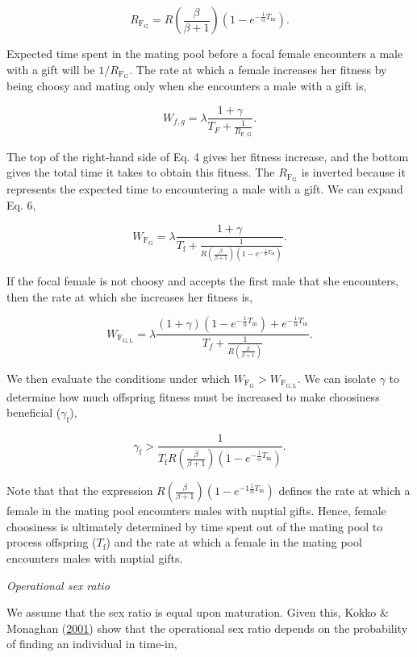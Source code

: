 \documentclass[
]{article}
\begin{document}
\[R_{\mathrm{F_{G}}} = R \left(\frac{\beta}{\beta + 1}\right)\left(1 - e^{-\frac{1}{\alpha}T_{\mathrm{m}}}\right).\]

Expected time spent in the mating pool before a focal female encounters
a male with a gift will be \(1/R_{\mathrm{F_{G}}}\). The rate at which a
female increases her fitness by being choosy and mating only when she
encounters a male with a gift is,

\[W_{f, g} = \lambda \frac{1 + \gamma}{T_{F} + \frac{1}{R_{\mathrm{F,G}}}}.
\tag{4}
\]

The top of the right-hand side of Eq. 4 gives her fitness increase, and
the bottom gives the total time it takes to obtain this fitness. The
\(R_{\mathrm{F_{G}}}\) is inverted because it represents the expected
time to encountering a male with a gift. We can expand Eq. 6,

\[W_{\mathrm{F_{G}}} = \lambda \frac{1 + \gamma}{T_{\mathrm{f}} + \frac{1}{R \left(\frac{\beta}{\beta + 1}\right)\left(1 - e^{-\frac{1}{\alpha}T_{\mathrm{m}}}\right)}}.\]

If the focal female is not choosy and accepts the first male that she
encounters, then the rate at which she increases her fitness is,

\[W_{\mathrm{F_{G,L}}} = \lambda \frac{\left(1 + \gamma\right)\left(1 - e^{-\frac{1}{\alpha}T_{\mathrm{m}}}\right) + e^{-\frac{1}{\alpha}T_{\mathrm{m}}}}{T_{f} + \frac{1}{R \left(\frac{\beta}{\beta + 1}\right)}}.\]

We then evaluate the conditions under which
\(W_{\mathrm{F_{G}}} > W_{\mathrm{F_{G,L}}}\). We can isolate \(\gamma\)
to determine how much offspring fitness must be increased to make
choosiness beneficial (\(\gamma_{\mathrm{f}}\)),

\[\gamma_{\mathrm{f}} > \frac{1}{T_{\mathrm{f}} R\left(\frac{\beta}{\beta + 1}\right) \left(1 - e^{-\frac{1}{\alpha}T_{\mathrm{m}}}\right)}.
\tag{5}
\]

Note that that the expression
\(R\left(\frac{\beta}{\beta + 1}\right) \left(1 - e^{-1\frac{1}{\alpha}T_{\mathrm{m}}}\right)\)
defines the rate at which a female in the mating pool encounters males
with nuptial gifts. Hence, female choosiness is ultimately determined by
time spent out of the mating pool to process offspring
(\(T_{\mathrm{f}}\)) and the rate at which a female in the mating pool
encounters males with nuptial gifts.

\emph{Operational sex ratio}

We assume that the sex ratio is equal upon maturation. Given this, Kokko
\& Monaghan (\protect\hyperlink{ref-Kokko2001}{2001}) show that the
operational sex ratio depends on the probability of finding an
individual in time-in,
\end{document}
